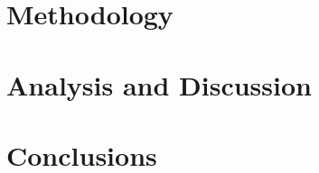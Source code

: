 \documentclass[a4paper]{report}
\begin{document}
\section{Methodology}
\section{Analysis and Discussion}

\section{Conclusions}
\end{document}
